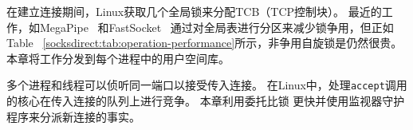 在建立连接期间，Linux获取几个全局锁来分配TCB（TCP控制块）。
最近的工作，如MegaPipe~ \cite {han2012megapipe}和FastSocket~ \cite {lin2016scalable}通过对全局表进行分区来减少锁争用，但正如Table~ \ref {socksdirect:tab:operation-performance}所示，非争用自旋锁是仍然很贵。
本章将工作分发到每个进程中的用户空间库\libipc {}。

多个进程和线程可以侦听同一端口以接受传入连接。
在Linux中，处理\texttt {accept}调用的核心在传入连接的队列上进行竞争。
本章利用委托比锁 \cite {roghanchi2017ffwd}更快并使用监视器守护程序来分派新连接的事实。








